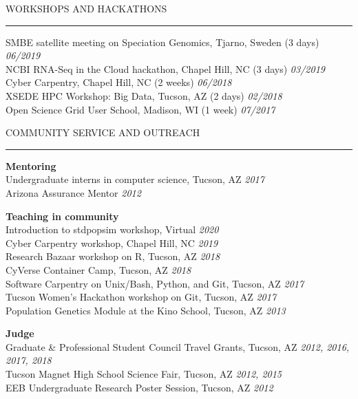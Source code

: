 \documentclass{resume} %
\renewenvironment{rSection}[1]{
\sectionskip
\textcolor{RoyalPurple}{\MakeUppercase{#1}}
\sectionlineskip
\hrule
\begin{list}{}{
\setlength{\leftmargin}{1.5em}
}
\item[]
}{
\end{list}
}
\begin{document}


\begin{rSection}{Workshops and Hackathons}

SMBE satellite meeting on Speciation Genomics, Tjarno, Sweden (3 days) \hfill{\em 06/2019}\\
NCBI RNA-Seq in the Cloud hackathon, Chapel Hill, NC (3 days) \hfill {\em 03/2019}\\
Cyber Carpentry, Chapel Hill, NC (2 weeks) \hfill {\em 06/2018}\\
XSEDE HPC Workshop: Big Data, Tucson, AZ (2 days) \hfill {\em 02/2018}\\
Open Science Grid User School, Madison, WI (1 week) \hfill {\em 07/2017}

\end{rSection}


\begin{rSection}{Community Service and Outreach}

\textbf{Mentoring}\\
Undergraduate interns in computer science, Tucson, AZ \hfill {\em 2017}\\
Arizona Assurance Mentor \hfill {\em 2012}

\textbf{Teaching in community}\\
Introduction to stdpopsim workshop, Virtual \hfill {\em 2020}\\
Cyber Carpentry workshop, Chapel Hill, NC \hfill {\em 2019}\\
Research Bazaar workshop on R, Tucson, AZ \hfill {\em 2018}\\
CyVerse Container Camp, Tucson, AZ \hfill {\em 2018}\\
Software Carpentry on Unix/Bash, Python, and Git, Tucson, AZ \hfill {\em 2017}\\
Tucson Women’s Hackathon workshop on Git, Tucson, AZ \hfill {\em 2017}\\
Population Genetics Module at the Kino School, Tucson, AZ \hfill {\em 2013}

\textbf{Judge}\\
Graduate \& Professional Student Council Travel Grants, Tucson, AZ \hfill {\em 2012, 2016, 2017, 2018}\\
Tucson Magnet High School Science Fair, Tucson, AZ \hfill {\em 2012, 2015}\\
EEB Undergraduate Research Poster Session, Tucson, AZ \hfill {\em 2012}

\end{rSection}
\end{document}
